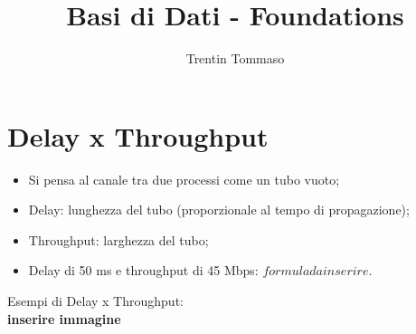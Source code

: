 \documentclass{article}
\title{Basi di Dati - Foundations}
\author{Trentin Tommaso}
\begin{document}
    \maketitle
    \tableofcontents
    \newpage

    \section{Delay x Throughput}
    \begin{itemize}
      \item Si pensa al canale tra due processi come un tubo vuoto;
      \item Delay: lunghezza del tubo (proporzionale al tempo di propagazione);
      \item Throughput: larghezza del tubo;
      \item Delay di 50 ms e throughput di 45 Mbps: $formula da inserire$. 
    \end{itemize}
    Esempi di Delay x Throughput: \\
    \textbf{inserire immagine}
\end{document}
